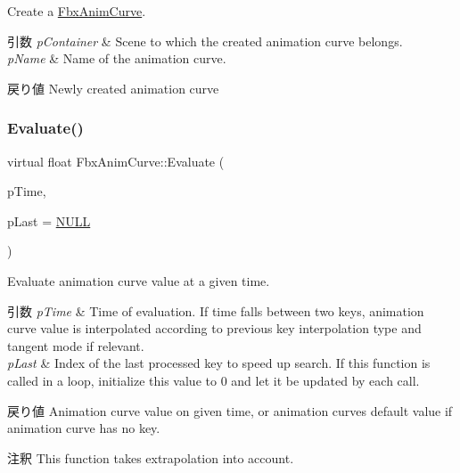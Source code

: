 Create a \hyperlink{class_fbx_anim_curve}{Fbx\+Anim\+Curve}. 
\begin{DoxyParams}{引数}
{\em p\+Container} & Scene to which the created animation curve belongs. \\
\hline
{\em p\+Name} & Name of the animation curve. \\
\hline
\end{DoxyParams}
\begin{DoxyReturn}{戻り値}
Newly created animation curve 
\end{DoxyReturn}
\mbox{\label{class_fbx_anim_curve_a74a3ea7a22a69fe69141722adff7f01b}} 
\subsubsection{\texorpdfstring{Evaluate()}{Evaluate()}}
{\footnotesize\ttfamily virtual float Fbx\+Anim\+Curve\+::\+Evaluate (\begin{DoxyParamCaption}\item[{\hyperlink{class_fbx_time}{Fbx\+Time}}]{p\+Time,  }\item[{int $\ast$}]{p\+Last = {\ttfamily \hyperlink{fbxarch_8h_a070d2ce7b6bb7e5c05602aa8c308d0c4}{N\+U\+LL}} }\end{DoxyParamCaption})\hspace{0.3cm}{\ttfamily [pure virtual]}}

Evaluate animation curve value at a given time. 
\begin{DoxyParams}{引数}
{\em p\+Time} & Time of evaluation. If time falls between two keys, animation curve value is interpolated according to previous key interpolation type and tangent mode if relevant. \\
\hline
{\em p\+Last} & Index of the last processed key to speed up search. If this function is called in a loop, initialize this value to 0 and let it be updated by each call. \\
\hline
\end{DoxyParams}
\begin{DoxyReturn}{戻り値}
Animation curve value on given time, or animation curve\textquotesingle{}s default value if animation curve has no key. 
\end{DoxyReturn}
\begin{DoxyRemark}{注釈}
This function takes extrapolation into account. 
\end{DoxyRemark}



